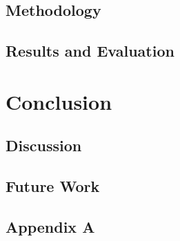 \documentclass[12pt]{report}
\begin{document}
\section{Methodology}

\section{Results and Evaluation}

\chapter{Conclusion}
\label{ch:conclusion}

\section{Discussion}

\section{Future Work}

\pagebreak





\begin{appendices}
\chapter*{Appendix A}
\label{apdx:constraints}

\end{appendices}
\end{document}

